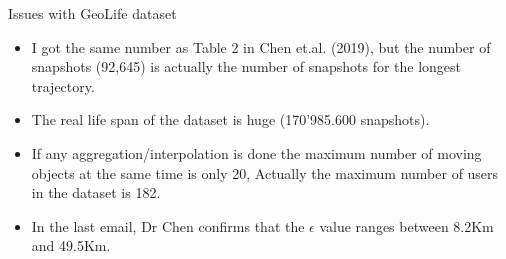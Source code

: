 \documentclass{beamer}
\begin{document}
\begin{frame}{Issues with GeoLife dataset}
    \begin{itemize}
        \item I got the same number as Table 2 in Chen et.al. (2019), but the number of snapshots (92,645) is actually the number of snapshots for the longest trajectory.
        \item The real life span of the dataset is huge (170'985.600 snapshots).
        \item If any aggregation/interpolation is done the maximum number of moving objects at the same time is only 20, Actually the maximum number of users in the dataset is 182.
        \item In the last email, Dr Chen confirms that the $\epsilon$ value ranges between 8.2Km and 49.5Km.
    \end{itemize}
\end{frame}
\end{document}
